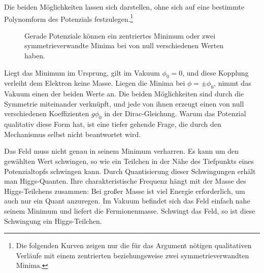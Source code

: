 Die beiden Möglichkeiten lassen sich darstellen, ohne sich auf eine bestimmte Polynomform des Potenzials festzulegen.\footnote{Die folgenden Kurven zeigen nur die für das Argument nötigen qualitativen Verläufe mit einem zentrierten beziehungsweise zwei symmetrieverwandten Minima.}
\begin{figure}[htbp]
\centering
{}
\caption{Gerade Potenziale können ein zentriertes Minimum oder zwei symmetrieverwandte Minima bei von null verschiedenen Werten haben.}
\end{figure}

Liegt das Minimum im Ursprung, gilt im Vakuum \(\phi_0=0\), und diese Kopplung verleiht dem Elektron keine Masse. Liegen die Minima bei \(\phi=\pm\phi_0\), nimmt das Vakuum einen der beiden Werte an. Die beiden Möglichkeiten sind durch die Symmetrie miteinander verknüpft, und jede von ihnen erzeugt einen von null verschiedenen Koeffizienten \(g\phi_0\) in der Dirac-Gleichung. Warum das Potenzial qualitativ diese Form hat, ist eine tiefer gehende Frage, die durch den Mechanismus selbst nicht beantwortet wird.

Das Feld muss nicht genau in seinem Minimum verharren. Es kann um den gewählten Wert schwingen, so wie ein Teilchen in der Nähe des Tiefpunkts eines Potenzialtopfs schwingen kann. Durch Quantisierung dieser Schwingungen erhält man Higgs-Quanten. Ihre charakteristische Frequenz hängt mit der Masse des Higgs-Teilchens zusammen: Bei großer Masse ist viel Energie erforderlich, um auch nur ein Quant anzuregen. Im Vakuum befindet sich das Feld einfach nahe seinem Minimum und liefert die Fermionenmasse. Schwingt das Feld, so ist diese Schwingung ein Higgs-Teilchen.

